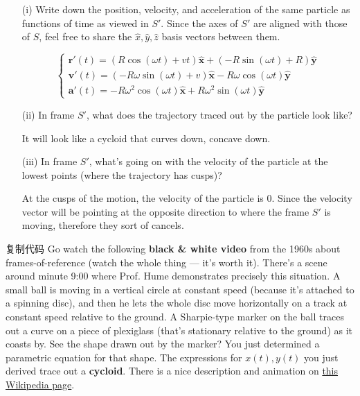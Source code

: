 \documentclass[12pt]{article}
\newcommand{\paren}[1]{\left( #1 \right)}
\newcommand{\unx}{\hat{\mathbf{x}}}
\newcommand{\uny}{\hat{\mathbf{y}}}
\begin{document}
\begin{enumerate}
    \item[(i)] Write down the position, velocity, and acceleration of the same particle as functions of time as viewed in \(S'\). Since the axes of \(S'\) are aligned with those of \(S\), feel free to share the \(\hat{x}, \hat{y}, \hat{z}\) basis vectors between them.

    \[
    \begin{cases}
        \mathbf{r'}(t) = \paren{R\cos\paren{\omega t} + vt}\unx + \paren{-R\sin\paren{\omega t} + R}\uny\\
        \mathbf{v'}(t) = \paren{-R\omega\sin\paren{\omega t}+ v}\unx  -R\omega\cos\paren{\omega t}\uny\\
        \mathbf{a'}(t)  = -R\omega^2\cos(\omega t) \unx + R\omega^2\sin(\omega t)\uny
    \end{cases}
    \]

    
    
    \item[(ii)] In frame \(S'\), what does the trajectory traced out by the particle look like?

    It will look like a cycloid that curves down, concave down. 



    \item[(iii)] In frame \(S'\), what’s going on with the velocity of the particle at the lowest points (where the trajectory has cusps)?

    At the cusps of the motion, the velocity of the particle is 0. Since the velocity vector will be pointing at the opposite direction to where the frame $S'$ is moving, therefore they sort of cancels. 
\end{enumerate}


复制代码
Go watch the following \textbf{black \& white video} from the 1960s about frames-of-reference (watch the whole thing — it’s worth it). There’s a scene around minute 9:00 where Prof. Hume demonstrates precisely this situation. A small ball is moving in a vertical circle at constant speed (because it’s attached to a spinning disc), and then he lets the whole disc move horizontally on a track at constant speed relative to the ground. A Sharpie-type marker on the ball traces out a curve on a piece of plexiglass (that’s stationary relative to the ground) as it coasts by. See the shape drawn out by the marker? You just determined a parametric equation for that shape. The expressions for \( x(t), y(t) \) you just derived trace out a \textbf{cycloid}. There is a nice description and animation on \href{https://en.wikipedia.org/wiki/Cycloid}{this Wikipedia page}.
\end{document}
